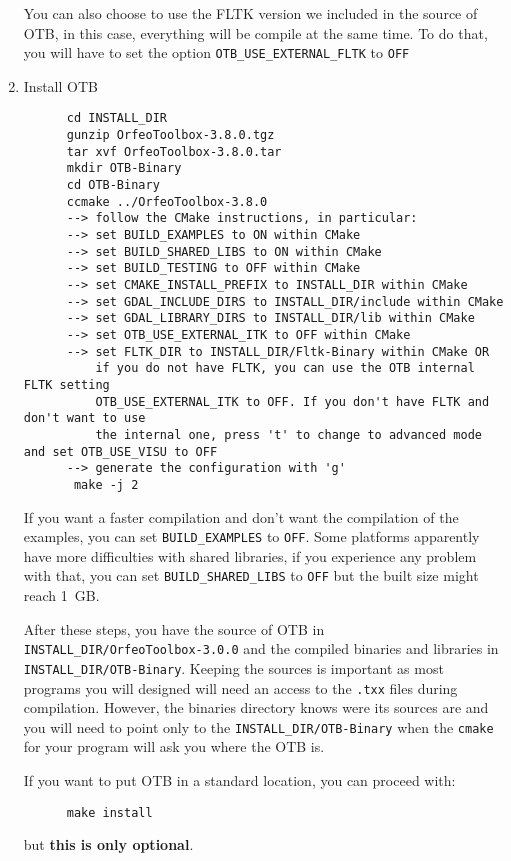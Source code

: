 \begin{enumerate}
   You can also choose to use the FLTK version we included in the source of OTB, in this case, everything will be compile at the same time. To do that, you will have to set the option \texttt{OTB\_USE\_EXTERNAL\_FLTK} to \texttt{OFF}

\item Install OTB
  \begin{verbatim}
      cd INSTALL_DIR
      gunzip OrfeoToolbox-3.8.0.tgz
      tar xvf OrfeoToolbox-3.8.0.tar
      mkdir OTB-Binary
      cd OTB-Binary
      ccmake ../OrfeoToolbox-3.8.0
      --> follow the CMake instructions, in particular:
	  --> set BUILD_EXAMPLES to ON within CMake
	  --> set BUILD_SHARED_LIBS to ON within CMake
	  --> set BUILD_TESTING to OFF within CMake
	  --> set CMAKE_INSTALL_PREFIX to INSTALL_DIR within CMake
	  --> set GDAL_INCLUDE_DIRS to INSTALL_DIR/include within CMake
	  --> set GDAL_LIBRARY_DIRS to INSTALL_DIR/lib within CMake
	  --> set OTB_USE_EXTERNAL_ITK to OFF within CMake
	  --> set FLTK_DIR to INSTALL_DIR/Fltk-Binary within CMake OR
	      if you do not have FLTK, you can use the OTB internal FLTK setting  
	      OTB_USE_EXTERNAL_ITK to OFF. If you don't have FLTK and don't want to use 
	      the internal one, press 't' to change to advanced mode and set OTB_USE_VISU to OFF
	  --> generate the configuration with 'g'
       make -j 2
  \end{verbatim}

  If you want a faster compilation and don't want the compilation of the examples, you
  can set \texttt{BUILD\_EXAMPLES} to \texttt{OFF}. Some platforms apparently
  have more difficulties with shared libraries, if you experience any problem
  with that, you can set \texttt{BUILD\_SHARED\_LIBS} to \texttt{OFF} but the
  built size might reach 1~GB.

  After these steps, you have the source of OTB in \texttt{INSTALL\_DIR/OrfeoToolbox-3.0.0}
  and the compiled binaries and libraries in \texttt{INSTALL\_DIR/OTB-Binary}. Keeping
  the sources is important as most programs you will designed will need an access
  to the \texttt{.txx} files during compilation. However, the binaries directory knows were
  its sources are and you will need to point only to the \texttt{INSTALL\_DIR/OTB-Binary}
  when the \texttt{cmake} for your program will ask you where the OTB is.

  If you want to put OTB in a standard location, you can proceed with:

  \begin{verbatim}
      make install
  \end{verbatim}

  but \textbf{this is only optional}.


\end{enumerate}

